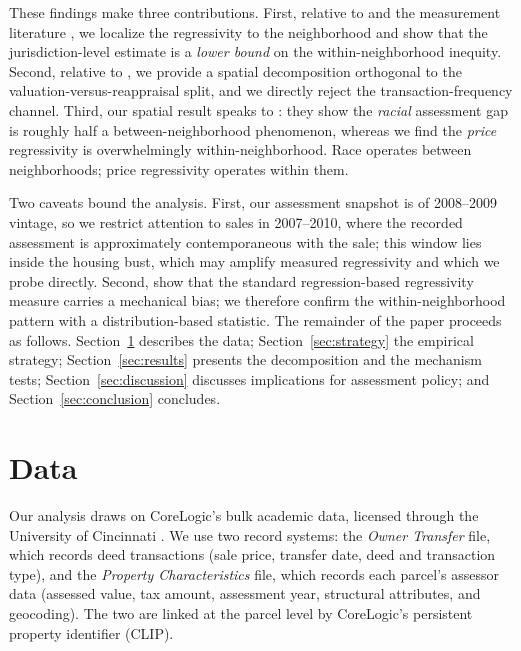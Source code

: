 \documentclass[12pt, letterpaper]{article}
\begin{document}
These findings make three contributions. First, relative to \citet{berry2021reassessing} and the measurement literature \citep{mcmillen2023measures}, we localize the regressivity to the neighborhood and show that the jurisdiction-level estimate is a \emph{lower bound} on the within-neighborhood inequity. Second, relative to \citet{amornsiripanitch2022why}, we provide a spatial decomposition orthogonal to the valuation-versus-reappraisal split, and we directly reject the transaction-frequency channel. Third, our spatial result speaks to \citet{avenancioleon2022assessment}: they show the \emph{racial} assessment gap is roughly half a between-neighborhood phenomenon, whereas we find the \emph{price} regressivity is overwhelmingly within-neighborhood. Race operates between neighborhoods; price regressivity operates within them.

Two caveats bound the analysis. First, our assessment snapshot is of 2008--2009 vintage, so we restrict attention to sales in 2007--2010, where the recorded assessment is approximately contemporaneous with the sale; this window lies inside the housing bust, which may amplify measured regressivity and which we probe directly. Second, \citet{mcmillen2023measures} show that the standard regression-based regressivity measure carries a mechanical bias; we therefore confirm the within-neighborhood pattern with a distribution-based statistic. The remainder of the paper proceeds as follows. Section~\ref{sec:data} describes the data; Section~\ref{sec:strategy} the empirical strategy; Section~\ref{sec:results} presents the decomposition and the mechanism tests; Section~\ref{sec:discussion} discusses implications for assessment policy; and Section~\ref{sec:conclusion} concludes.

\section{Data}\label{sec:data}

Our analysis draws on CoreLogic's bulk academic data, licensed through the University of Cincinnati \citep{corelogic_data}. We use two record systems: the \emph{Owner Transfer} file, which records deed transactions (sale price, transfer date, deed and transaction type), and the \emph{Property Characteristics} file, which records each parcel's assessor data (assessed value, tax amount, assessment year, structural attributes, and geocoding). The two are linked at the parcel level by CoreLogic's persistent property identifier (CLIP).
\end{document}
